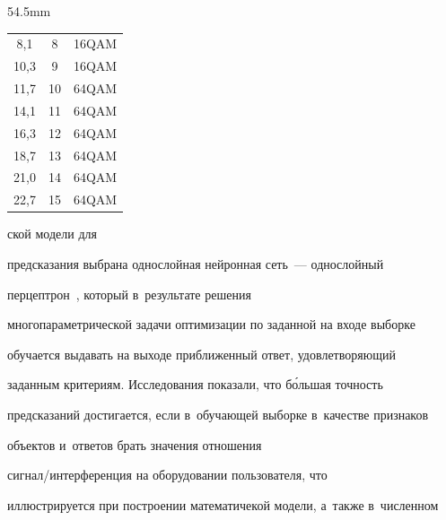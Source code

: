 \begin{floatingfigure}{54.5mm}
{\begin{center}
\begin{tabular}{|c|c|c|}
  8,1    & \hphantom{9}8& 16QAM\\


  10,3\hphantom{9}& \hphantom{9}9& 16QAM\\


  11,7\hphantom{9}& 10& 64QAM\\


  14,1\hphantom{9}& 11& 64QAM\\


  16,3\hphantom{9}& 12& 64QAM\\


  18,7\hphantom{9}& 13& 64QAM\\


  21,0\hphantom{9} & 14& 64QAM\\


  22,7\hphantom{9} & 15& 64QAM\\


  \hline


  \end{tabular}


  \end{center}


  }




\end{floatingfigure}





\noindent


ской модели для 


предсказания выбрана однослойная нейронная сеть~--- однослойный 


перцептрон~\cite{3-bob}, который в~результате решения 


многопараметрической задачи оптимизации по заданной на входе выборке 


обуча\-ет\-ся выдавать на выходе приближенный ответ, удовле\-тво\-ря\-ющий 


заданным критериям. Исследования показали, что б\'{о}льшая точ\-ность 


предсказаний достигается, если в~обуча\-ющей выборке в~качестве признаков 


объектов и~ответов брать значения отношения  


сиг\-нал\!/\!ин\-тер\-фе\-рен\-ция на оборудовании пользователя, что 


ил\-люст\-ри\-ру\-ет\-ся при по\-стро\-ении математичекой модели, а~так\-же в~чис\-лен\-ном 


